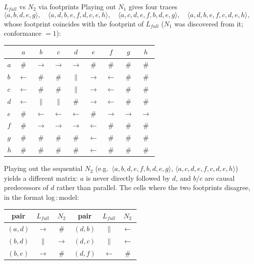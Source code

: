 \begin{examplebox}{$L_{full}$ vs $N_2$ via footprints}
Playing out $N_1$ gives four traces
$$\langle a,b,d,e,g \rangle, \quad \langle a,d,b,e,f,d,c,e,h \rangle, \quad \langle a,c,d,e,f,b,d,e,g \rangle, \quad \langle a,d,b,e,f,c,d,e,h \rangle,$$
whose footprint coincides with the footprint of $L_{full}$ ($N_1$ was discovered from it; conformance $= 1$):
\begin{center}
\small
\begin{tabular}{l*{8}{c}}
\toprule
 & $a$ & $b$ & $c$ & $d$ & $e$ & $f$ & $g$ & $h$ \\
\midrule
$a$ & $\#$ & $\to$ & $\to$ & $\to$ & $\#$ & $\#$ & $\#$ & $\#$ \\
$b$ & $\leftarrow$ & $\#$ & $\#$ & $\|$ & $\to$ & $\leftarrow$ & $\#$ & $\#$ \\
$c$ & $\leftarrow$ & $\#$ & $\#$ & $\|$ & $\to$ & $\leftarrow$ & $\#$ & $\#$ \\
$d$ & $\leftarrow$ & $\|$ & $\|$ & $\#$ & $\to$ & $\leftarrow$ & $\#$ & $\#$ \\
$e$ & $\#$ & $\leftarrow$ & $\leftarrow$ & $\leftarrow$ & $\#$ & $\to$ & $\to$ & $\to$ \\
$f$ & $\#$ & $\to$ & $\to$ & $\to$ & $\leftarrow$ & $\#$ & $\#$ & $\#$ \\
$g$ & $\#$ & $\#$ & $\#$ & $\#$ & $\leftarrow$ & $\#$ & $\#$ & $\#$ \\
$h$ & $\#$ & $\#$ & $\#$ & $\#$ & $\leftarrow$ & $\#$ & $\#$ & $\#$ \\
\bottomrule
\end{tabular}
\end{center}
Playing out the sequential $N_2$ (e.g.\ $\langle a,b,d,e,f,b,d,e,g \rangle$, $\langle a,c,d,e,f,c,d,e,h \rangle$) yields a different matrix: $a$ is never directly followed by $d$, and $b/c$ are causal predecessors of $d$ rather than parallel. The cells where the two footprints disagree, in the format log\,:\,model:
\begin{center}
\small
\begin{tabular}{ccc@{\qquad}ccc}
\toprule
pair & $L_{full}$ & $N_2$ & pair & $L_{full}$ & $N_2$ \\
\midrule
$(a,d)$ & $\to$ & $\#$ & $(d,b)$ & $\|$ & $\leftarrow$ \\
$(b,d)$ & $\|$ & $\to$ & $(d,c)$ & $\|$ & $\leftarrow$ \\
$(b,e)$ & $\to$ & $\#$ & $(d,f)$ & $\leftarrow$ & $\#$ \\

\end{tabular}
\end{center}
\end{examplebox}
